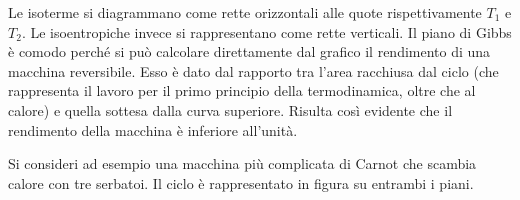 \begin{figure}[htpb]
\end{figure}
\FloatBarrier
Le isoterme si diagrammano come rette orizzontali alle quote rispettivamente $T_1$ e $T_2$. Le isoentropiche invece si rappresentano come rette verticali. Il piano di Gibbs è comodo perché si può calcolare direttamente dal grafico il rendimento di una macchina reversibile. Esso è dato dal rapporto tra l'area racchiusa dal ciclo (che rappresenta il lavoro per il primo principio della termodinamica, oltre che al calore) e quella sottesa dalla curva superiore.
Risulta così evidente che il rendimento della macchina è inferiore all'unità.

Si consideri ad esempio una macchina più complicata di Carnot che scambia calore con tre serbatoi. Il ciclo è rappresentato in figura su entrambi i piani.

